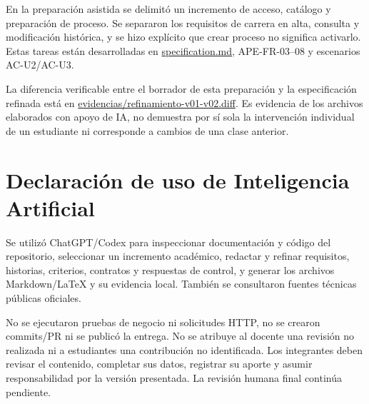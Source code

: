 \documentclass[11pt,a4paper]{article}
\begin{document}
En la preparación asistida se delimitó un incremento de acceso, catálogo
y preparación de proceso. Se separaron los requisitos de carrera en
alta, consulta y modificación histórica, y se hizo explícito que crear
proceso no significa activarlo. Estas tareas están desarrolladas en
\url{specification.md}, APE-FR-03--08 y escenarios AC-U2/AC-U3.

La diferencia verificable entre el borrador de esta preparación y la
especificación refinada está en
\url{evidencias/refinamiento-v01-v02.diff}. Es evidencia de los archivos
elaborados con apoyo de IA, no demuestra por sí sola la intervención
individual de un estudiante ni corresponde a cambios de una clase
anterior.

\section{Declaración de uso de Inteligencia
Artificial}\label{declaraciuxf3n-de-uso-de-inteligencia-artificial}

Se utilizó ChatGPT/Codex para inspeccionar documentación y código del
repositorio, seleccionar un incremento académico, redactar y refinar
requisitos, historias, criterios, contratos y respuestas de control, y
generar los archivos Markdown/LaTeX y su evidencia local. También se
consultaron fuentes técnicas públicas oficiales.

No se ejecutaron pruebas de negocio ni solicitudes HTTP, no se crearon
commits/PR ni se publicó la entrega. No se atribuye al docente una
revisión no realizada ni a estudiantes una contribución no identificada.
Los integrantes deben revisar el contenido, completar sus datos,
registrar su aporte y asumir responsabilidad por la versión presentada.
La revisión humana final continúa pendiente.
\end{document}
